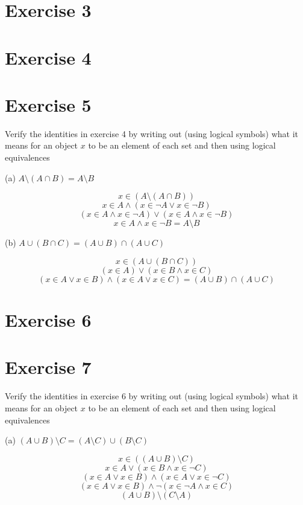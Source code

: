 \documentclass[11pt]{article}
\begin{document}
\section*{Exercise 3}


\section*{Exercise 4}


\section*{Exercise 5}

Verify the identities in exercise 4 by writing out (using logical symbols) what it means for an object $x$ to be an element of each set and then using logical equivalences

\noindent (a) $A \setminus (A \cap B) = A \setminus B$

$$x \in (A \setminus (A \cap B))$$
$$x \in A \wedge (x \in \neg A \vee x \in \neg B)$$
$$(x \in A \wedge x \in \neg A) \vee (x \in A \wedge x \in \neg B)$$
$$x \in A \wedge x \in \neg B = A \setminus B$$

\noindent (b) $A \cup (B \cap C) = (A \cup B) \cap (A \cup C)$

$$x \in (A \cup (B \cap C))$$
$$(x \in A) \vee (x \in B \wedge x \in C)$$
$$(x \in A \vee x \in B) \wedge (x \in A \vee x \in C) = (A \cup B) \cap (A \cup C)$$

\section*{Exercise 6}


\section*{Exercise 7}

Verify the identities in exercise 6 by writing out (using logical symbols) what it means for an object $x$ to be an element of each set and then using logical equivalences

\noindent (a) $(A \cup B) \setminus C = (A \setminus C) \cup (B \setminus C)$

$$x \in ((A \cup B) \setminus C)$$
$$x \in A \vee (x \in B \wedge x \in \neg C)$$
$$(x \in A \vee x \in B) \wedge (x \in A \vee x \in \neg C)$$
$$(x \in A \vee x \in B) \wedge \neg(x \in \neg A \wedge x \in C)$$
$$(A \cup B) \setminus (C \setminus A)$$
\end{document}
